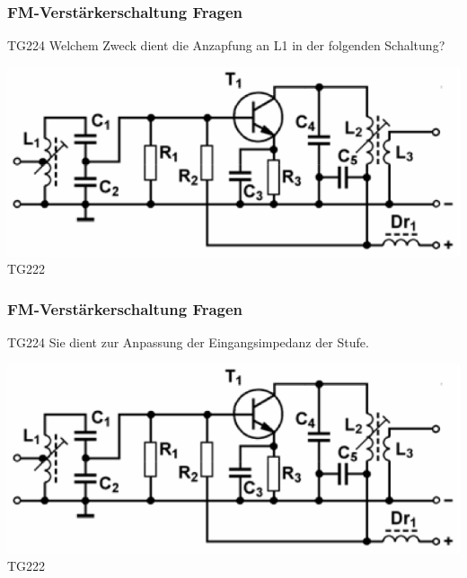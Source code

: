 \begin{frame}
    \frametitle{FM-Verstärkerschaltung Fragen}
    \begin{center} \Large
        \begin{block}{TG224}
		\large Welchem Zweck dient die Anzapfung an L1 in der folgenden Schaltung?
    	\end{block}
        \includegraphics[width=1\textwidth]{a07/TG222.png}\\
        \tiny TG222 \hyperlink{refs}{\cite{bna}}
    \end{center}
\end{frame}

\begin{frame}
    \frametitle{FM-Verstärkerschaltung Fragen}
    \begin{center}\Large
        \begin{block}{TG224}
		\large Sie dient zur Anpassung der Eingangsimpedanz der Stufe.
    	\end{block}
        \includegraphics[width=1\textwidth]{a07/TG222.png}\\
        \tiny TG222 \hyperlink{refs}{\cite{bna}}
    \end{center}
\end{frame}

